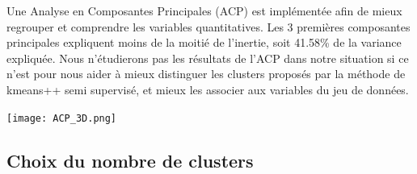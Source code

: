 \documentclass[12pt,a4paper]{book}
\newcommand{\1}{\mathds{1}}
\begin{document}
\vspace{5 mm}
\noindent
Une Analyse en Composantes Principales (ACP) est implémentée afin de mieux regrouper et comprendre les variables quantitatives. Les 3 premières composantes principales expliquent moins de la moitié de l'inertie, soit 41.58\% de la variance expliquée.  Nous n'étudierons pas les résultats de l'ACP dans notre situation si ce n'est pour nous aider à mieux distinguer les clusters proposés par la méthode de kmeans++ semi supervisé, et mieux les associer aux variables du jeu de données.

\begin{center}
\texttt{[image: ACP\_3D.png]}
\end{center}


\vspace{30 mm}
\noindent
\begin{large}
\subsection{Choix du nombre de clusters}
\end{large}
\vspace{5 mm}
\end{document}
